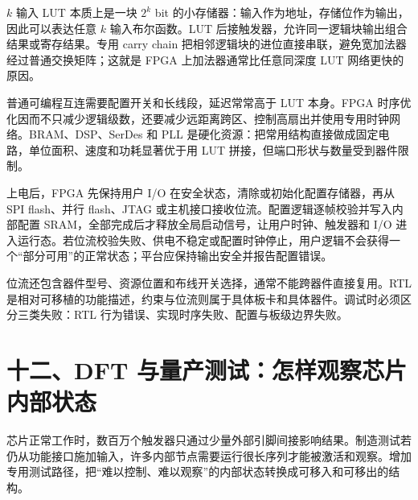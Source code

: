 
$k$ 输入 LUT 本质上是一块 $2^k$ bit 的小存储器：输入作为地址，存储位作为输出，因此可以表达任意 $k$ 输入布尔函数。LUT 后接触发器，允许同一逻辑块输出组合结果或寄存结果。专用 carry chain 把相邻逻辑块的进位直接串联，避免宽加法器经过普通交换矩阵；这就是 FPGA 上加法器通常比任意同深度 LUT 网络更快的原因。

普通可编程互连需要配置开关和长线段，延迟常常高于 LUT 本身。FPGA 时序优化因而不只减少逻辑级数，还要减少远距离跨区、控制高扇出并使用专用时钟网络。BRAM、DSP、SerDes 和 PLL 是硬化资源：把常用结构直接做成固定电路，单位面积、速度和功耗显著优于用 LUT 拼接，但端口形状与数量受到器件限制。


上电后，FPGA 先保持用户 I/O 在安全状态，清除或初始化配置存储器，再从 SPI flash、并行 flash、JTAG 或主机接口接收位流。配置逻辑逐帧校验并写入内部配置 SRAM，全部完成后才释放全局启动信号，让用户时钟、触发器和 I/O 进入运行态。若位流校验失败、供电不稳定或配置时钟停止，用户逻辑不会获得一个“部分可用”的正常状态；平台应保持输出安全并报告配置错误。

位流还包含器件型号、资源位置和布线开关选择，通常不能跨器件直接复用。RTL 是相对可移植的功能描述，约束与位流则属于具体板卡和具体器件。调试时必须区分三类失败：RTL 行为错误、实现时序失败、配置与板级边界失败。

\section{十二、DFT 与量产测试：怎样观察芯片内部状态}

芯片正常工作时，数百万个触发器只通过少量外部引脚间接影响结果。制造测试若仍从功能接口施加输入，许多内部节点需要运行很长序列才能被激活和观察。增加专用测试路径，把“难以控制、难以观察”的内部状态转换成可移入和可移出的结构。

